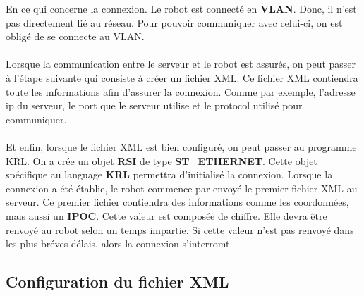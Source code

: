 En ce qui concerne la connexion.
Le robot est connecté en \textbf{VLAN}.
Donc, il n'est pas directement lié au réseau.
Pour pouvoir communiquer avec celui-ci, on est obligé de se connecte au VLAN.
\\
\\
Lorsque la communication entre le serveur et le robot est assurés, on peut passer à l'étape suivante qui consiste à créer un fichier XML.
Ce fichier XML contiendra toute les informations afin d'assurer la connexion.
Comme par exemple, l'adresse ip du serveur, le port que le serveur utilise et le protocol utilisé pour communiquer.
\\
\\
Et enfin, lorsque le fichier XML est bien configuré, on peut passer au programme KRL.
On a crée un objet \textbf{RSI} de type \textbf{ST\_ETHERNET}.
Cette objet spécifique au language \textbf{KRL} permettra d'initialisé la connexion.
Lorsque la connexion a été établie, le robot commence par envoyé le premier fichier XML au serveur.
Ce premier fichier contiendra des informations comme les coordonnées, mais aussi un \textbf{IPOC}.
Cette valeur est composée de chiffre.
Elle devra être renvoyé au robot selon un temps impartie.
Si cette valeur n'est pas renvoyé dans les plus bréves délais, alors la connexion s'interromt.

\subsection{Configuration du fichier XML}


